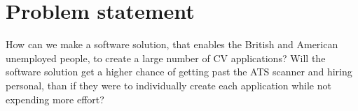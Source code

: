 \section{Problem statement}\label{sec:problem}
How can we make a software solution, that enables the British and American unemployed people, 
to create a large number of CV applications?
Will the software solution get a higher chance of getting past the ATS scanner and hiring personal, than
if they were to individually create each application while not expending more effort? 